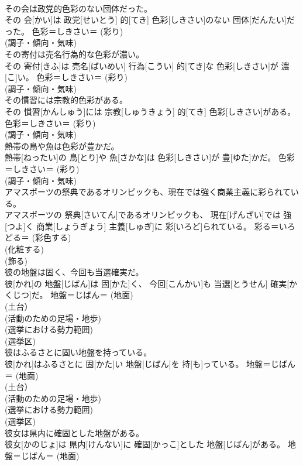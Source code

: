 \documentclass[8pt]{extreport}
\begin{document}
\begin{CJK}{UTF8}{min}
{\\	その会は政党的色彩のない団体だった。	
\\	その 会[かい]は 政党[せいとう] 的[てき] 色彩[しきさい]のない 団体[だんたい]だった。	色彩＝しきさい＝ (彩り) 
\\	(調子・傾向・気味) 
\\	その寄付は売名行為的な色彩が濃い。	
\\	その 寄付[きふ]は 売名[ばいめい] 行為[こうい] 的[てき]な 色彩[しきさい]が 濃[こ]い。	色彩＝しきさい＝ (彩り) 
\\	(調子・傾向・気味) 
\\	その慣習には宗教的色彩がある。	
\\	その 慣習[かんしゅう]には 宗教[しゅうきょう] 的[てき] 色彩[しきさい]がある。	色彩＝しきさい＝ (彩り) 
\\	(調子・傾向・気味) 
\\	熱帯の鳥や魚は色彩が豊かだ。	
\\	熱帯[ねったい]の 鳥[とり]や 魚[さかな]は 色彩[しきさい]が 豊[ゆた]かだ。	色彩＝しきさい＝ (彩り) 
\\	(調子・傾向・気味) 
\\	アマスポーツの祭典であるオリンピックも、現在では強く商業主義に彩られている。	
\\	アマスポーツの 祭典[さいてん]であるオリンピックも、 現在[げんざい]では 強[つよ]く 商業[しょうぎょう] 主義[しゅぎ]に 彩[いろど]られている。	彩る＝いろどる＝ (彩色する) 
\\	(化粧する) 
\\	(飾る) 
\\	彼の地盤は固く、今回も当選確実だ。	
\\	彼[かれ]の 地盤[じばん]は 固[かた]く、 今回[こんかい]も 当選[とうせん] 確実[かくじつ]だ。	地盤＝じばん＝ (地面) 
\\	(土台）
\\	(活動のための足場・地歩) 
\\	(選挙における勢力範囲) 
\\	(選挙区) 
\\	彼はふるさとに固い地盤を持っている。	
\\	彼[かれ]はふるさとに 固[かた]い 地盤[じばん]を 持[も]っている。	地盤＝じばん＝ (地面) 
\\	(土台）
\\	(活動のための足場・地歩) 
\\	(選挙における勢力範囲) 
\\	(選挙区) 
\\	彼女は県内に確固とした地盤がある。	
\\	彼女[かのじょ]は 県内[けんない]に 確固[かっこ]とした 地盤[じばん]がある。	地盤＝じばん＝ (地面) 
}
\end{CJK}
\end{document}
